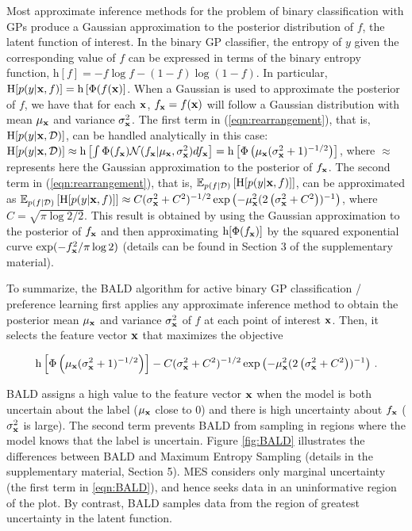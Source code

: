 Most approximate inference methods for the problem of binary classification with
GPs produce a Gaussian approximation to the posterior distribution of $f$, the
latent function of interest. In the binary GP classifier, the entropy of $y$ given the corresponding value of $f$ 
can be expressed in terms of the binary entropy function, $\mathrm{h}[f]=- f\log f - (1-f)\log(1-f)$.
In particular,
$\mathrm{H}[p(y\vert\mathbf{x},f)] = \mathrm{h}\left[\Phi(f(\mathbf{x})\right]$.
When a Gaussian is used to approximate the posterior of $f$,  we have that
for each $\mathbf{x}$, $f_{\mathbf{x}} = f(\mathbf{x})$ will follow a Gaussian distribution with mean $\mu_{\mathbf{x}}$ and
variance $\sigma_{\mathbf{x}}^2$.
The first term in (\ref{eqn:rearrangement}), that is, $\mathrm{H}[p(y\vert\mathbf{x},\mathcal{D})]$, can be handled analytically in this case:
$\mathrm{H}[p(y\vert\mathbf{x},\mathcal{D})] \approx \mathrm{h}\left[ \int \Phi( f_{\mathbf{x}} )
\mathcal{N}(f_{\mathbf{x}}| \mu_{\mathbf{x}},\sigma_{\mathbf{x}}^2) df_{\mathbf{x}} \right]
= \mathrm{h} \left[ \Phi\left( \mu_{\mathbf{x}} (\sigma^2_{\mathbf{x}} + 1)^{-1/2}\right)\right]$,
where $\approx$ represents here the Gaussian approximation to the posterior of $f_{\mathbf{x}}$.
The second term in (\ref{eqn:rearrangement}), that is,
$\mathbb{E}_{p(f\vert\mathcal{D})} \left[ \mathrm{H}[p(y\vert\mathbf{x}, f)] \right]$, can be approximated as
$ \mathbb{E}_{p(f\vert\mathcal{D})} \left[ \mathrm{H}[p(y\vert\mathbf{x}, f)] \right] \approx
C(\sigma_{\mathbf{x}}^2 + C^2)^{-1/2}\exp\left(-\mu_{\mathbf{x}}^2(2\left(\sigma_{\mathbf{x}}^2 + C^2\right))^{-1}\right)$,
where $C=\sqrt{\pi\log 2 / 2}$. This result is obtained by
using the Gaussian approximation to the posterior of $f_{\mathbf{x}}$
and then approximating $\mathrm{h}[\Phi(f_{\mathbf{x}})]$
by the squared exponential curve $\exp(-f_{\mathbf{x}}^2/\pi\log 2)$
(details can be found in Section 3 of the supplementary material).

To summarize, the BALD algorithm for active binary GP classification / preference learning first applies
any approximate inference method to obtain the posterior mean
$\mu_{\mathbf{x}}$ and variance $\sigma_{\mathbf{x}}^2$ of $f$ at each point of interest $\mathbf{x}$. Then, it selects the
feature vector $\mathbf{x}$ that maximizes the objective

\vspace{-0.5cm}
{\small
\begin{equation}
\mathrm{h} \left[ \Phi\left( \mu_{\mathbf{x}}(\sigma^2_{\mathbf{x}} + 1)^{-1/2} \right)\right] -
C(\sigma_{\mathbf{x}}^2 + C^2)^{-1/2} \exp\left(-\mu_{\mathbf{x}}^2(2\left(\sigma_{\mathbf{x}}^2 + C^2\right))^{-1}\right)\,.\label{eqn:BALD}
\end{equation}
}

\vspace{-0.6cm}
\normalsize BALD assigns a high value to the feature vector $\mathbf{x}$ when the model is both uncertain
about the label ($\mu_{\mathbf{x}}$ close to 0) and there is high uncertainty about $f_{\mathbf{x}}$
($\sigma_{\mathbf{x}}^2$ is large). The second term prevents BALD from sampling in regions
where the model knows that the label is uncertain. Figure \ref{fig:BALD} illustrates
the differences between BALD and Maximum Entropy Sampling \cite{sebastiani2000} (details in the supplementary material, Section 5).
MES considers only marginal uncertainty (the first term in \eqref{eqn:BALD}), and hence seeks data in an
uninformative region of the plot. By contrast, BALD samples data from the
region of greatest uncertainty in the latent function.
